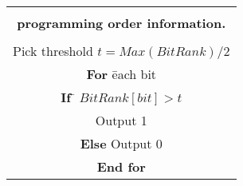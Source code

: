 
\begin{center}

\begin{tabular}{|c|}
\hline
\begin{minipage}[t]{3.2in}



\begin{tabbing}
{\bf Algorithm VI  Generate a binary signature from the partial  }
\\ {\bf programming order information. }
\\
\\ Pick threshold $t = Max(BitRank) / 2$
\\ {\bf For} \= each bit
\\ \>    {\bf If} \= $BitRank[bit] > t$
\\ \>\>       Output 1
\\ \>    {\bf Else} Output 0
\\ {\bf End for}


\end{tabbing}
\end{minipage}
\\ \hline
\end{tabular}
\end{center}
